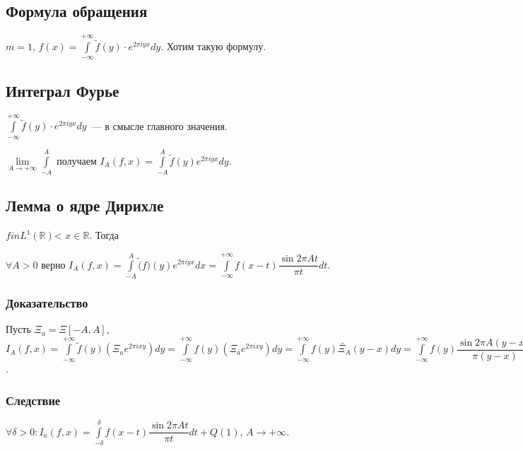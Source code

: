 \documentclass{article}
\begin{document}
    \subsection{Формула обращения}
    
        $m = 1$, $f(x) = \int\limits^{+\infty}_{-\infty} \widetilde{f}(y) \cdot e^{2 \pi i y x} dy$. Хотим такую формулу.
        
    \subsection{Интеграл Фурье}
    
        $\int\limits^{+\infty}_{-\infty} \widetilde{f}(y) \cdot e^{2 \pi i y x} dy$~--- в смысле главного значения.
        
        $\lim\limits_{A \rightarrow +\infty} \int\limits^A_{-A}$ получаем $I_A(f, x) = \int\limits^A_{-A} \widetilde{f}(y) e^{2 \pi i y x} dy$.
        
    \subsection{Лемма о ядре Дирихле}
    
        $f in L^1 (\mathbb{R})$< $x \in \mathbb{R}$. Тогда 
        
        $\forall A > 0$ верно $I_A(f, x) = \int\limits^A_{-A} \widetilde(f)(y) e^{2 \pi i y x} dx = \int\limits^{+\infty}_{-\infty} f(x - t) \dfrac{\sin {2 \pi A t}}{\pi t} dt$.
        
        \subsubsection{Доказательство}
        
            Пусть $\Xi_a = \Xi [-A, A]$, $I_A(f, x) = \int\limits^{+\infty}_{-\infty} \widetilde{f}(y) \left( \Xi_a e^{2 \pi i x y } \right) dy = \int\limits^{+\infty}_{-\infty} f(y) \left( \Xi_a e^{2 \pi i x y}  \right) dy = \int\limits^{+\infty}_{-\infty} f(y) \widetilde{\Xi_A} (y - x) dy = \int\limits^{+\infty}_{-\infty} f(y) \dfrac{\sin 2 \pi A (y - x)}{\pi (y - x)} dy$.
            
        \subsubsection{Следствие}
        
            $\forall \delta > 0 : I_a(f, x) = \int\limits^{\delta}_{-\delta} f(x - t) \dfrac{\sin 2 \pi A t}{\pi t} dt + Q(1)$, $A \rightarrow +\infty$.
            
\end{document}
